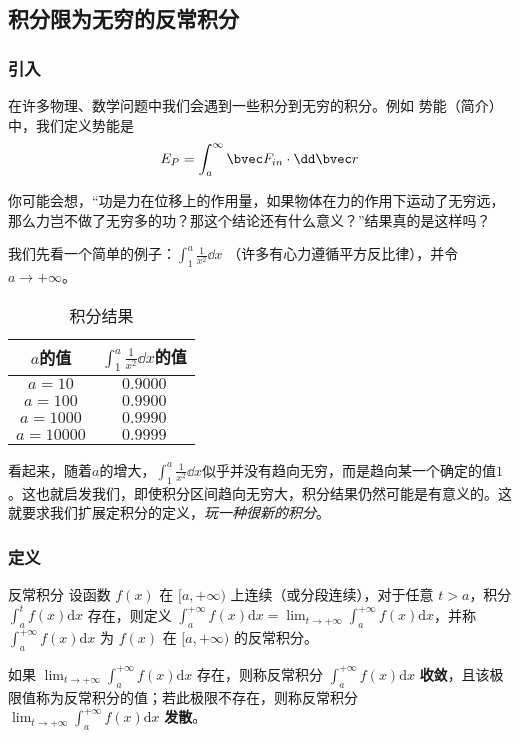 \begin{issues}
\issueTODO
\issueDraft
\end{issues}

\subsection{积分限为无穷的反常积分}

\subsubsection{引入}
在许多物理、数学问题中我们会遇到一些积分到无穷的积分。例如 势能（简介） 中，我们定义势能是
$$E_P=\int ^\infty_a \bvec F_{in} \cdot \dd \bvec r$$

你可能会想，“功是力在位移上的作用量，如果物体在力的作用下运动了无穷远，那么力岂不做了无穷多的功？那这个结论还有什么意义？”结果真的是这样吗？

我们先看一个简单的例子：$\int^a_1 \frac{1}{x^2} \dd x$ （许多有心力遵循平方反比律），并令$a\to+\infty$。

\begin{table}[ht]
\centering
\caption{积分结果}\label{impro_tab1}
\begin{tabular}{|c|c|}
\hline
$a$的值 & $\int^a_1 \frac{1}{x^2} \dd x$的值 \\
\hline
$a=10$ & $0.9000$ \\
\hline
$a=100$ & $0.9900$ \\
\hline
$a=1000$ & $0.9990$ \\
\hline
$a=10000$& $0.9999$\\
\hline
\end{tabular}
\end{table}
看起来，随着$a$的增大，$\int^a_1 \frac{1}{x^2} \dd x$似乎并没有趋向无穷，而是趋向某一个确定的值$1$。这也就启发我们，即使积分区间趋向无穷大，积分结果仍然可能是有意义的。这就要求我们扩展定积分的定义，\textsl{玩一种很新的积分}。

\subsubsection{定义}
\begin{definition}{反常积分}
设函数 $f(x)$ 在 $[a, +\infty)$ 上连续（或分段连续），对于任意 $t>a$，积分 $\displaystyle \int^t_af(x)\mathrm{d} x$ 存在，则定义 $\displaystyle \int ^{+\infty}_a f(x)\mathrm{d} x=\lim_{t\rightarrow+\infty }\int _a^{+\infty}f(x)\mathrm{d} x$，并称 $\displaystyle \int ^{+\infty}_a f(x)\mathrm{d} x $ 为 $f(x)$ 在 $[a, +\infty)$ 的反常积分。

如果 $\displaystyle \lim_{t\rightarrow+\infty }\int _a^{+\infty}f(x)\mathrm{d} x$ 存在，则称反常积分 $\displaystyle \int ^{+\infty}_a f(x)\mathrm{d} x$ \textbf{收敛}，且该极限值称为反常积分的值；若此极限不存在，则称反常积分 $\displaystyle \lim_{t\rightarrow+\infty }\int _a^{+\infty}f(x)\mathrm{d} x$ \textbf{发散}。
\end{definition}

